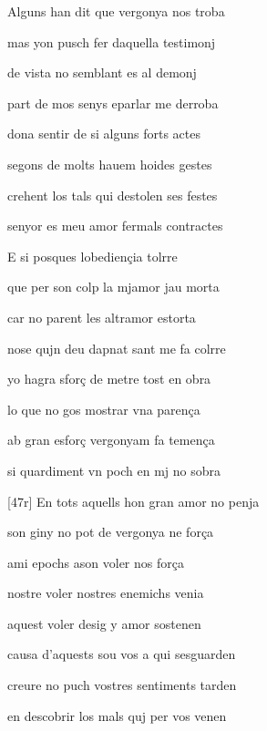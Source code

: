 \documentclass[12pt]{article}
\begin{document}
\begin{estrofa}

 Alguns han dit que vergonya nos troba

 mas yon pusch fer daquella testimonj

 de vista no semblant es al demonj

 part de mos senys eparlar me derroba

 dona sentir de si alguns forts actes

 segons de molts hauem hoides gestes

 crehent los tals qui destolen ses festes

 senyor es meu amor fermals contractes

\end{estrofa}



\begin{estrofa}

 E si posques lobedien\c{c}ia tolrre

 que per son colp la mjamor jau morta

 car no parent les altramor estorta

 nose qujn deu dapnat sant me fa colrre

 yo hagra sfor\c{c} de metre tost en obra

 lo que no gos mostrar vna paren\c{c}a

 ab gran esfor\c{c} vergonyam fa temen\c{c}a

 si quardiment vn poch en mj no sobra

\end{estrofa}



\begin{estrofa}

 [47r] En tots aquells hon gran amor no penja

 son giny no pot de vergonya ne for\c{c}a

 ami epochs ason voler nos for\c{c}a

 nostre voler nostres enemichs venia

 aquest voler desig y amor sostenen

 causa d'aquests sou vos a qui sesguarden

 creure no puch vostres sentiments tarden

 en descobrir los mals quj per vos venen

\end{estrofa}
\end{document}
